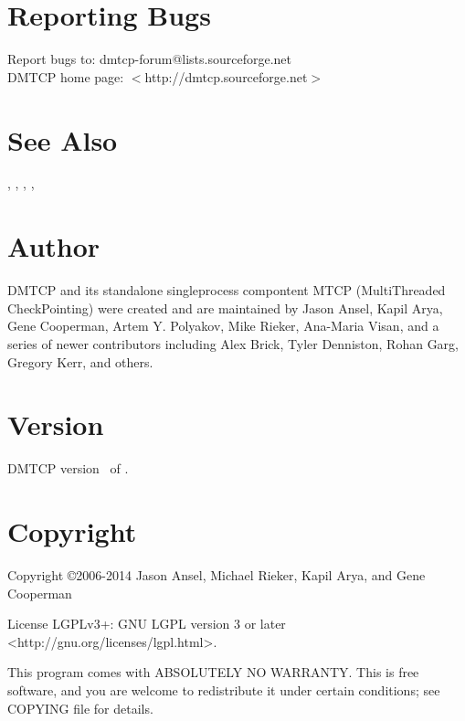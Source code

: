 \section{Reporting Bugs}
Report bugs to: dmtcp-forum@lists.sourceforge.net\\
DMTCP home page: $<$http://dmtcp.sourceforge.net$>$

\section{See Also}
, , ,
, 

\section{Author}
DMTCP and its standalone single\-process compontent MTCP (MultiThreaded
CheckPointing) were created and are maintained by Jason Ansel, Kapil Arya,
Gene Cooperman, Artem Y. Polyakov, Mike Rieker, Ana-Maria Visan, and a series
of newer contributors including Alex Brick, Tyler Denniston, Rohan Garg,
Gregory Kerr, and others.

\section{Version}

DMTCP version \Version\ of \Date.

\section{Copyright}
Copyright \copyright 2006-2014  Jason Ansel, Michael Rieker, Kapil Arya, and
Gene Cooperman

License LGPLv3+: GNU LGPL version 3 or later <http://gnu.org/licenses/lgpl.html>.

This program comes with ABSOLUTELY NO WARRANTY.
This is free software, and you are welcome to redistribute it under certain
conditions; see COPYING file for details.
